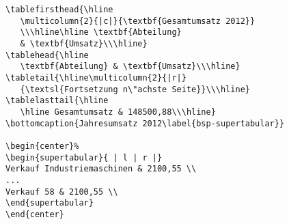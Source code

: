 \begin{programm}[htbp]
\begin{lstlisting}[showstringspaces=false]
\tablefirsthead{\hline
   \multicolumn{2}{|c|}{\textbf{Gesamtumsatz 2012}}
   \\\hline\hline \textbf{Abteilung} 
   & \textbf{Umsatz}\\\hline}
\tablehead{\hline 
   \textbf{Abteilung} & \textbf{Umsatz}\\\hline}
\tabletail{\hline\multicolumn{2}{|r|}
   {\textsl{Fortsetzung n\"achste Seite}}\\\hline}
\tablelasttail{\hline
   \hline Gesamtumsatz & 148500,88\\\hline}
\bottomcaption{Jahresumsatz 2012\label{bsp-supertabular}}

\begin{center}%
\begin{supertabular}{ | l | r |}
Verkauf Industriemaschinen & 2100,55 \\
...
Verkauf 58 & 2100,55 \\
\end{supertabular}
\end{center}

\end{lstlisting}
\caption{Quelltext zur Erzeugung der \vref{bsp-supertabular}\label{quelltext-bsp-supertabular}}
\end{programm}




